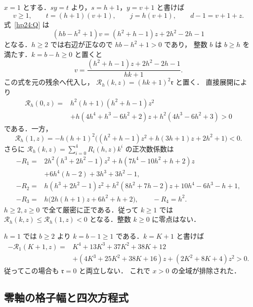 $x=1$ とする．$sy=t$ より，$s=h+1$，$y=v+1$ と書けば
\[
 v\ge1,\qquad t=(h+1)(v+1),\qquad j=h(v+1),\qquad d-1=v+1+z.
\]
式~\eqref{hp24:Q} は
\begin{equation}\label{hp24:x-one-v}
 (hb-h^2+1)v=(h^2+h-1)z+2h^2-2h-1
\end{equation}
となる．$h\ge2$ では右辺が正なので $hb-h^2+1>0$ であり，
整数 $b$ は $b\ge h$ を満たす．$k=b-h\ge0$ と置くと
\[
 v=\frac{(h^2+h-1)z+2h^2-2h-1}{hk+1}.
\]
この式を元の残余へ代入し，
$\mathcal R_h(k,z)=(hk+1)^2\mathfrak r$ と置く．
直接展開により
\begin{equation}\label{hp24:R0}
\begin{aligned}
\mathcal R_h(0,z)={}&h^2(h+1)(h^2+h-1)z^2\\
&+h(4h^4+h^3-6h^2+2)z+h^2(4h^3-6h^2+3)>0
\end{aligned}
\end{equation}
である．一方，
\begin{equation}\label{hp24:R1}
\mathcal R_h(1,z)=-h(h+1)^2\bigl((h^2+h-1)z^2+h(3h+1)z+2h^2+1\bigr)<0.
\end{equation}
さらに $\mathcal R_h(k,z)=\sum_{i=0}^4 R_i(h,z)k^i$ の正次数係数は
\begin{align*}
-R_1={}&2h^2(h^3+2h^2-1)z^2+h(7h^4-10h^2+h+2)z\\
 &+6h^4(h-2)+3h^3+3h^2-1,\\
-R_2={}&h(h^3+2h^2-1)z^2+h^2(8h^2+7h-2)z
 +10h^4-6h^3-h+1,\\
-R_3={}&h\bigl(2h(h+1)z+6h^2+h+2\bigr),\qquad -R_4=h^2.
\end{align*}
$h\ge2,z\ge0$ で全て厳密に正である．従って $k\ge1$ では
$\mathcal R_h(k,z)\le \mathcal R_h(1,z)<0$ となる．整数 $k\ge0$ に零点はない．

$h=1$ では $b\ge2$ より $k=b-1\ge1$ である．$k=K+1$ と書けば
\begin{equation}\label{hp24:h-one}
\begin{aligned}
-\mathcal R_1(K+1,z)={}&K^4+13K^3+37K^2+38K+12\\
&+(4K^3+25K^2+38K+16)z+(2K^2+8K+4)z^2>0.
\end{aligned}
\end{equation}
従ってこの場合も $\mathfrak r=0$ と両立しない．
これで $x>0$ の全域が排除された．

\subsection{零軸の格子幅と四次方程式}

